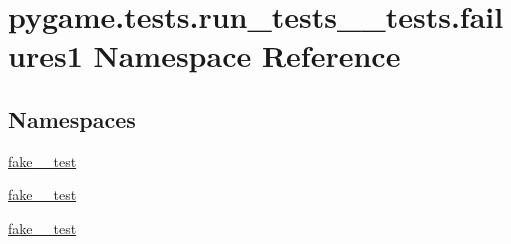 \hypertarget{namespacepygame_1_1tests_1_1run__tests____tests_1_1failures1}{}\section{pygame.\+tests.\+run\+\_\+tests\+\_\+\+\_\+tests.\+failures1 Namespace Reference}
\label{namespacepygame_1_1tests_1_1run__tests____tests_1_1failures1}
\subsection*{Namespaces}
\begin{DoxyCompactItemize}
\item 
 \hyperlink{namespacepygame_1_1tests_1_1run__tests____tests_1_1failures1_1_1fake__2__test}{fake\+\_\+\_\+test}
\item 
 \hyperlink{namespacepygame_1_1tests_1_1run__tests____tests_1_1failures1_1_1fake__3__test}{fake\+\_\+\_\+test}
\item 
 \hyperlink{namespacepygame_1_1tests_1_1run__tests____tests_1_1failures1_1_1fake__4__test}{fake\+\_\+\_\+test}
\end{DoxyCompactItemize}
